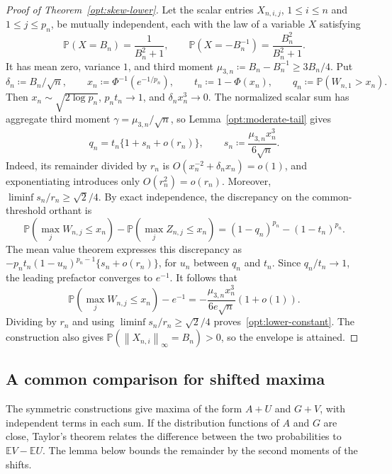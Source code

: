 \documentclass[11pt,letterpaper]{article}
\theoremstyle{remark}
\newcommand{\E}{\mathbb E}
\newcommand{\Pp}{\mathbb P}
\newcommand{\norm}[1]{\left\lVert#1\right\rVert}
\begin{document}
\begin{proof}[Proof of Theorem~\ref{opt:skew-lower}]
Let the scalar entries \(X_{n,i,j}\), \(1\le i\le n\) and
\(1\le j\le p_n\), be mutually independent, each with the law of a
variable \(X\) satisfying
\begin{equation}
 \Pp(X=B_n)=\frac1{B_n^2+1},\qquad
 \Pp(X=-B_n^{-1})=\frac{B_n^2}{B_n^2+1}.
 \label{opt:two-point-law}
\end{equation}
It has mean zero, variance \(1\), and third moment
\(\mu_{3,n}\coloneqq B_n-B_n^{-1}\ge3B_n/4\). Put
\[
 \delta_n\coloneqq B_n/\sqrt n,\qquad
 x_n\coloneqq\Phi^{-1}(e^{-1/p_n}),\qquad
 t_n\coloneqq1-\Phi(x_n),\qquad q_n\coloneqq\Pp(W_{n,1}>x_n).
\]
Then \(x_n\sim\sqrt{2\log p_n}\), \(p_nt_n\to1\), and
\(\delta_nx_n^3\to0\). The normalized scalar sum has aggregate
third moment \(\gamma=\mu_{3,n}/\sqrt n\), so
Lemma~\ref{opt:moderate-tail} gives
\begin{equation}
 q_n=t_n\{1+s_n+o(r_n)\},\qquad
 s_n\coloneqq\frac{\mu_{3,n}x_n^3}{6\sqrt n}.
 \label{opt:tail-linearization}
\end{equation}
Indeed, its remainder divided by \(r_n\) is
\(O(x_n^{-2}+\delta_nx_n)=o(1)\), and exponentiating introduces only
\(O(r_n^2)=o(r_n)\). Moreover,
\(\liminf s_n/r_n\ge\sqrt2/4\).
By exact independence, the discrepancy on the common-threshold orthant is
\[
 \Pp(\max_jW_{n,j}\le x_n)-\Pp(\max_jZ_{n,j}\le x_n)
 =(1-q_n)^{p_n}-(1-t_n)^{p_n}.
\]
The mean value theorem expresses this discrepancy as
\(-p_nt_n(1-u_n)^{p_n-1}\{s_n+o(r_n)\}\), for \(u_n\) between
\(q_n\) and \(t_n\). Since \(q_n/t_n\to1\), the leading prefactor
converges to \(e^{-1}\). It follows that
\begin{equation}
 \Pp(\max_jW_{n,j}\le x_n)-e^{-1}
 =-\frac{\mu_{3,n}x_n^3}{6e\sqrt n}(1+o(1)).
 \label{opt:exact-product-asymptotic}
\end{equation}
Dividing by \(r_n\) and using
\(\liminf s_n/r_n\ge\sqrt2/4\) proves~\eqref{opt:lower-constant}.
The construction also gives
\(\Pp(\norm{X_{n,i}}_\infty=B_n)>0\), so the envelope is attained.
\end{proof}

\subsection{A common comparison for shifted maxima}
\label{app:lower-comparison}

The symmetric constructions give maxima of the form \(A+U\) and
\(G+V\), with independent terms in each sum. If the distribution
functions of \(A\) and \(G\) are close, Taylor's theorem relates the
difference between the two probabilities to \(\E V-\E U\).
The lemma below bounds the remainder by the second moments of the shifts.
\end{document}
